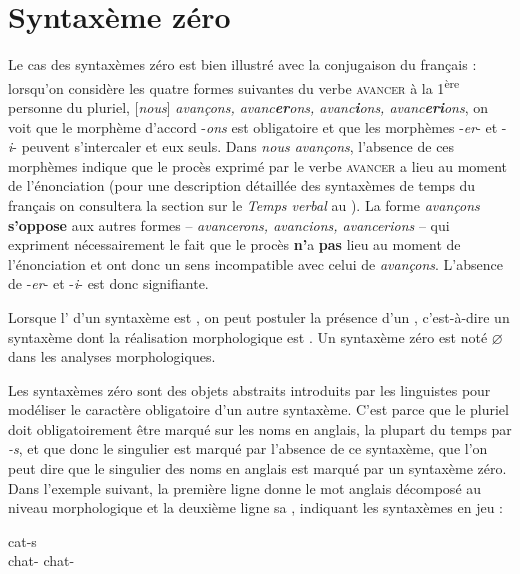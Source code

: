 \section{Syntaxème zéro}\label{sec:2.2.24}

Le cas des syntaxèmes zéro est bien illustré avec la conjugaison du français : lorsqu’on considère les quatre formes suivantes du verbe \textsc{avancer} à la 1\textsuperscript{ère} personne du pluriel, [\textit{nous}] \textit{avançons, avanc}\textbf{\textit{er}}\textit{ons, avanc}\textbf{\textit{i}}\textit{ons, avanc}\textbf{\textit{eri}}\textit{ons}, on voit que le morphème d’accord -\textit{ons} est obligatoire et que les morphèmes \mbox{-\textit{er}-} et  \mbox{-\textit{i}-} peuvent s’intercaler et eux seuls. Dans \textit{nous avançons}, l’absence de ces morphèmes indique que le procès exprimé par le verbe \textsc{avancer} a lieu au moment de l’énonciation (pour une description détaillée des syntaxèmes de temps du français on consultera la section sur le \textit{Temps verbal} au ). La forme \textit{avançons} \textbf{s’oppose} aux autres formes – \textit{avancerons, avancions, avancerions} – qui expriment nécessairement le fait que le procès \textbf{n’}a \textbf{pas} lieu au moment de l’énonciation et ont donc un sens incompatible avec celui de \textit{avançons}. L’absence de -\textit{er}{}- et -\textit{i}{}- est donc signifiante.

{Lorsque l’ d’un syntaxème est , on peut postuler la présence d’un , c’est-à-dire un syntaxème dont la réalisation morphologique est . Un syntaxème zéro est noté ${\varnothing}$ dans les analyses morphologiques.}

Les syntaxèmes zéro sont des objets abstraits introduits par les linguistes pour modéliser le caractère obligatoire d’un autre syntaxème. C’est parce que le pluriel doit obligatoirement être marqué sur les noms en anglais, la plupart du temps par \textit{{}-s}, et que donc le singulier est marqué par l’absence de ce syntaxème, que l’on peut dire que le singulier des noms en anglais est marqué par un syntaxème zéro. Dans l’exemple suivant, la première ligne donne le mot anglais décomposé au niveau morphologique et la deuxième ligne sa , indiquant les syntaxèmes en jeu :

\ea
{}  \hspace{1em}  {cat-s}\\
      {chat-\SG}  {}  {chat-\PL}\\
\z

